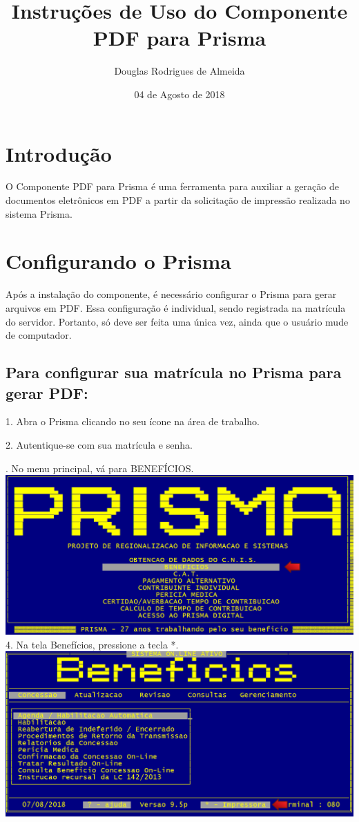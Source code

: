 \documentclass[12pt,a4paper]{article}
\title{Instruções de Uso do Componente PDF para Prisma}
\author{Douglas Rodrigues de Almeida}
\date{04 de Agosto de 2018}
\begin{document}
\maketitle

\section{Introdução}
O Componente PDF para Prisma é uma ferramenta para auxiliar a geração de documentos eletrônicos em PDF a partir da solicitação de impressão realizada no sistema Prisma.

\section{Configurando o Prisma}
Após a instalação do componente, é necessário configurar o Prisma para gerar arquivos em PDF. Essa configuração é individual, sendo registrada na matrícula do servidor. Portanto, só deve ser feita uma única vez, ainda que o usuário mude de computador.

\subsection{Para configurar sua matrícula no Prisma para gerar PDF:}
1. Abra o Prisma clicando no seu ícone na área de trabalho.

2. Autentique-se com sua matrícula e senha.

. No menu principal, vá para BENEFÍCIOS.\\
\includegraphics[width=1.0\textwidth, center]{menu}\\

\vspace{0.3cm}
4. Na tela Benefícios, pressione a tecla *.\\
\includegraphics[width=1.0\textwidth, center]{beneficios}\\
\end{document}
